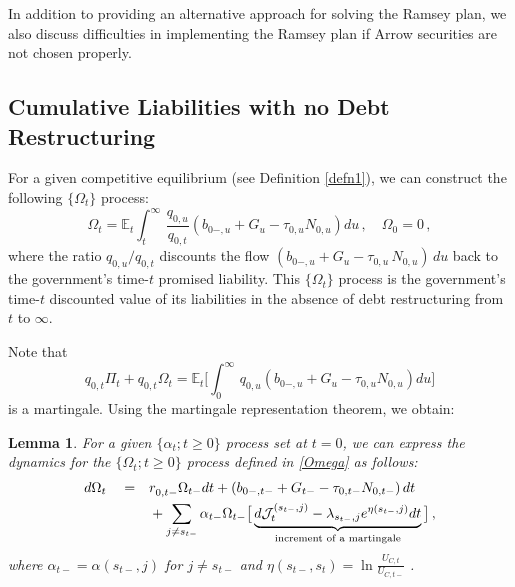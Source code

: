 \documentclass[12pt]{article}
\newtheorem{lemma}[theorem]{Lemma}
\newcommand{\NW}[1]{{\textcolor{blue}{#1}}}
\begin{document}
In addition to providing an alternative approach for solving the Ramsey plan, we also discuss difficulties in implementing the Ramsey plan if Arrow securities are not chosen properly. 





\subsection{{Cumulative Liabilities with no Debt Restructuring}}



For a given competitive equilibrium (see Definition \ref{defn1}), 
we can construct the following  $\{\Omega_t\}$ process: 
\begin{equation} \label{Omega}
\Omega_t %
= \mathbb{E}_t \int_{t}^\infty\, \frac{q_{0, u}}{q_{0, t}} \left(b_{0-, u} +G_u-\tau_{0, u} N_{0, u} \right)du \, , \quad  \Omega_0 = 0\, , 
\end{equation}   
where 
the ratio $q_{0,u}/q_{0,t}$ discounts the flow $(b_{0-,u}+G_u-\tau_{0,u}\, N_{0,u})\, du$ back to the government's time-$t$ promised liability. 
This $\{\Omega_t\}$ process is the government's time-$t$ discounted value of  its liabilities in the absence of  debt restructuring from $t$ to $\infty$.  


Note that %
\begin{equation}
q_{0, t}\Pi_t+q_{0, t}\Omega_t  =  \mathbb{E}_t \bigg[ \int_{0}^\infty\, {q_{0, u}}\left(b_{0-, u} +G_u-\tau_{0, u} N_{0, u} \right)du\bigg]
\end{equation}
is a martingale. Using the martingale representation theorem, we obtain:
\begin{lemma}\label{lemmaOmega0} %
	For a given  $\{\alpha_t; t\geq 0\}$ process set at $t=0$, 	we can express  the dynamics for 
	the  $\{\Omega_t; t\geq 0\}$ process defined in \eqref{Omega}  as follows:
	\begin{align}\label{dOmega0}
	d\Omega_t  
	\quad =& \quad r^{}_{0, t-}\Omega_{t-}dt 
	+ \left(b_{0-, t-} + G_{t-} - \tau_{0, t-} N_{0, t-} \right)dt   \notag \\
	&\quad + \sum_{j\neq s_{t-}} \alpha_{t-} \Omega_{t-} 
	\big[\underbrace{d {\mathcal J}_t^{(s_{t-}, j)} 
		- \lambda_{s_{t-}, j} e^{\eta(s_{t-}, j)} dt}_{\text{increment of a  martingale}} \big] \, ,
	\end{align}
	where $\alpha_{t-}=  \alpha(s_{t-}, j)$ for $j\neq s_{t-}$ and $\eta(s_{t-}, s_t) = \ln\frac{U_{C, t}}{U_{C, t-}}$ .  %
\end{lemma}
\end{document}
